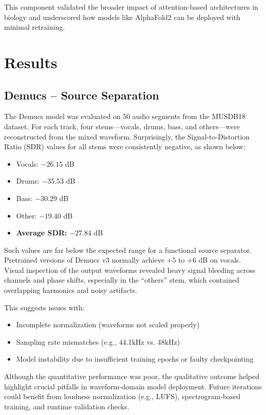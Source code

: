\documentclass{article}
\begin{document}
This component validated the broader impact of attention-based architectures in biology and underscored how models like AlphaFold2 can be deployed with minimal retraining.

\section{Results}

\subsection{Demucs – Source Separation}

The Demucs model was evaluated on 50 audio segments from the MUSDB18 dataset. For each track, four stems—vocals, drums, bass, and others—were reconstructed from the mixed waveform. Surprisingly, the Signal-to-Distortion Ratio (SDR) values for all stems were consistently negative, as shown below:

\begin{itemize}
  \item Vocals: $-26.15$ dB
  \item Drums: $-35.53$ dB
  \item Bass: $-30.29$ dB
  \item Other: $-19.40$ dB
  \item \textbf{Average SDR:} $-27.84$ dB
\end{itemize}

Such values are far below the expected range for a functional source separator. Pretrained versions of Demucs v3 normally achieve $+5$ to $+6$ dB on vocals. Visual inspection of the output waveforms revealed heavy signal bleeding across channels and phase shifts, especially in the ``others'' stem, which contained overlapping harmonics and noisy artifacts.

This suggests issues with:
\begin{itemize}
  \item Incomplete normalization (waveforms not scaled properly)
  \item Sampling rate mismatches (e.g., 44.1kHz vs. 48kHz)
  \item Model instability due to insufficient training epochs or faulty checkpointing
\end{itemize}

Although the quantitative performance was poor, the qualitative outcome helped highlight crucial pitfalls in waveform-domain model deployment. Future iterations could benefit from loudness normalization (e.g., LUFS), spectrogram-based training, and runtime validation checks.
\end{document}
